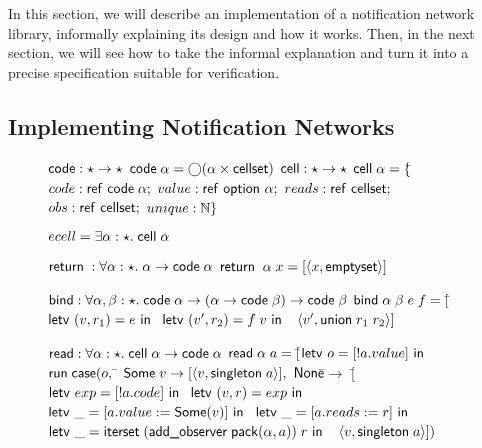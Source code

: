 \documentclass[preprint,natbib]{sigplanconf}
\begin{document}
In this section, we will describe an implementation of a notification
network library, informally explaining its design and how it
works. Then, in the next section, we will see how to take the informal
explanation and turn it into a precise specification suitable for
verification.

\subsection{Implementing Notification Networks}

\begin{figure}
{\small
\begin{specification}
$\mbox{\textsf{{code}}}\;{:}\; \star \to \star$ \nextline
$\mbox{\textsf{{code}}}\;{\alpha} = \bigcirc{(\alpha \times \mbox{\textsf{{cellset}}})}$ 
$\mbox{\textsf{{cell}}}\;{:}\; \star \to \star$ \nextline
$\mbox{\textsf{{cell}}}\;{\alpha} = \{$\=$code: \mbox{\textsf{{ref }}}\mbox{\textsf{{code}}}\;{\alpha};$ \nextline
                   \>$value: \mbox{\textsf{{ref }}}\mbox{\textsf{{option }}}{\alpha};$ \nextline
                   \>$reads: \mbox{\textsf{{ref }}}\mbox{\textsf{{cellset}}};$ \nextline
                   \>$obs:   \mbox{\textsf{{ref }}}\mbox{\textsf{{cellset}}};$ \nextline
                   \>$unique:    \mathbb{N}\}$ 

$ecell = \exists \alpha:\star.\; \mbox{\textsf{{cell}}}\;{\alpha}$ 

$\mbox{\textsf{{return}}}\; : \forall \alpha:\star.\; \alpha \to \mbox{\textsf{{code}}}\;{\alpha}$ \nextline
$\mbox{\textsf{{return}}}\;\;\alpha\;x = [\left<{x},{\mbox{\textsf{{emptyset}}}}\right>]$ 

$\mbox{\textsf{{bind}}} : \forall \alpha,\beta:\star.\; \mbox{\textsf{{code}}}\;{\alpha} \to (\alpha \to \mbox{\textsf{{code}}}\;{\beta}) \to \mbox{\textsf{{code}}}\;{\beta}$ \nextline
$\mbox{\textsf{{bind}}}\;\alpha\;\beta\;e\;f = [$\=$\mbox{\textsf{{letv }}}(v,r_1) = e\mbox{\textsf{{ in }}}$ \nextline
                        \>$\mbox{\textsf{{letv }}}(v',r_2) = f\;v\mbox{\textsf{{ in }}}$ \nextline
                        \>$\;\left<{v'},{\mbox{\textsf{{union}}}\;r_1\;r_2}\right>]$

$\mbox{\textsf{{read}}} : \forall \alpha:\star.\; \mbox{\textsf{{cell}}}\;{\alpha} \to \mbox{\textsf{{code}}}\;{\alpha}$ \nextline
$\mbox{\textsf{{read}}}\;\alpha\;a = [$\=$\mbox{\textsf{{letv }}}o = [!a.value]\mbox{\textsf{{ in }}}$ \nextline
                     \>$\mbox{\textsf{{run}}}\;\mbox{\textsf{{case}}}(o,$ \nextline
                     \>\qquad\= $\mbox{\textsf{{Some}}}\;v \to [\left<{v},{\mbox{\textsf{{singleton}}}\;a}\right>],$ \nextline
                     \>      \> $\mbox{\textsf{{None}}}$\=$ \to$ \nextline
                     \>      \>               \>$[$\=$\mbox{\textsf{{letv }}}exp = [!a.code]\mbox{\textsf{{ in }}}$ \nextline
                     \>      \>                     \>$\mbox{\textsf{{letv }}}(v,r) = exp\mbox{\textsf{{ in }}}$ \nextline
                     \>      \>                     \>$\mbox{\textsf{{letv }}}\_ = [a.value := \mbox{\textsf{{Some}}}(v)]\mbox{\textsf{{ in }}}$\nextline
                     \>      \>                     \>$\mbox{\textsf{{letv }}}\_ = [a.reads := r]\mbox{\textsf{{ in }}}$ \nextline
                     \>      \>                     \>$\mbox{\textsf{{letv }}}\_ = \mbox{\textsf{{iterset}}}\;(\mbox{\textsf{{add\_observer}}}\;\mbox{\textsf{{pack}}}({\alpha}, {a}))\;r\mbox{\textsf{{ in }}}$ \nextline
                     \>      \>                     \>$\;\left<{v},{\mbox{\textsf{{singleton}}}\;a}\right>])$ 


\end{specification}}
\end{figure}
\end{document}
